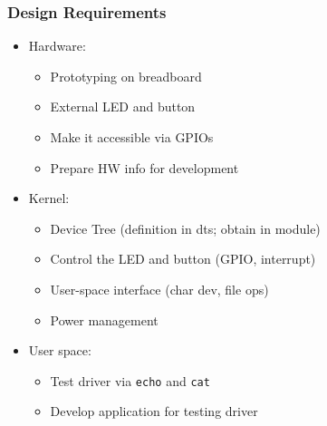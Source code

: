 \documentclass[aspectratio=169,usenames,dvipsnames]{beamer}
\begin{document}
\begin{frame}
  \frametitle{Design Requirements}
  \begin{itemize}

    \item Hardware:
    \begin{itemize}
      \item Prototyping on breadboard
      \item External LED and button
      \item Make it accessible via GPIOs
      \item Prepare HW info for development
    \end{itemize}

    \item Kernel:
    \begin{itemize}
      \item Device Tree (definition in dts; obtain in module)
      \item Control the LED and button (GPIO, interrupt)
      \item User-space interface (char dev, file ops)
      \item Power management
    \end{itemize}

    \item User space:
    \begin{itemize}
      \item Test driver via \texttt{echo} and \texttt{cat}
      \item Develop application for testing driver
    \end{itemize}
  \end{itemize}
\end{frame}
\end{document}
